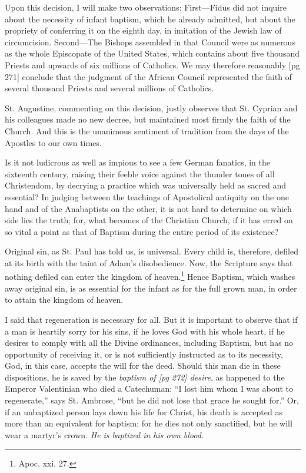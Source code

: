 Upon this decision, I will make two observations:
First—Fidus did not inquire about the
necessity of infant baptism, which he already admitted,
but about the propriety of conferring it
on the eighth day, in imitation of the Jewish law
of circumcision. Second—The Bishops assembled
in that Council were as numerous as the whole
Episcopate of the United States, which contains
about five thousand Priests and upwards of six
millions of Catholics. We may therefore reasonably
[pg 271]
conclude that the judgment of the African
Council represented the faith of several thousand
Priests and several millions of Catholics.

St. Augustine, commenting on this decision,
justly observes that St. Cyprian and his colleagues
made no new decree, but maintained most
firmly the faith of the Church. And this is the
unanimous sentiment of tradition from the days
of the Apostles to our own times.

Is it not ludicrous as well as impious to see a
few German fanatics, in the sixteenth century,
raising their feeble voice against the thunder
tones of all Christendom, by decrying a practice
which was universally held as sacred and essential?
In judging between the teachings of Apostolical
antiquity on the one hand and of the Anabaptists
on the other, it is not hard to determine
on which side lies the truth; for, what becomes
of the Christian Church, if it has erred on so vital
a point as that of Baptism during the entire
period of its existence?

Original sin, as St. Paul has told us, is universal.
Every child is, therefore, defiled at its
birth with the taint of Adam's disobedience. Now,
the Scripture says that nothing defiled can enter
the kingdom of heaven.\footnote{Apoc.
xxi. 27.} Hence Baptism, which
washes away original sin, is as essential for the
infant as for the full grown man, in order to attain
the kingdom of heaven.

I said that regeneration is necessary for all.
But it is important to observe that if a man is
heartily sorry for his sins, if he loves God with
his whole heart, if he desires to comply with all
the Divine ordinances, including Baptism, but has
no opportunity of receiving it, or is not sufficiently
instructed as to its necessity, God, in this case,
accepts the will for the deed. Should this man die
in these dispositions, he is saved by the \emph{baptism of
[pg 272]
desire}, as happened to the Emperor Valentinian
who died a Catechuman: “I lost him whom I was
about to regenerate,” says St. Ambrose, “but he
did not lose that grace he sought for.” Or, if an unbaptized
person lays down his life for Christ, his
death is accepted as more than an equivalent for
baptism; for he dies not only sanctified, but he will
wear a martyr's crown. \emph{He is baptized in his own
blood.}

